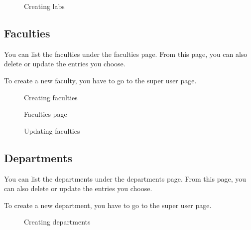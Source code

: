 \documentclass[letterpaper,10pt,english]{sphinxmanual}
\begin{document}
\begin{figure}[htbp]
\centering
\capstart

\noindent{}
\caption{Creating labs}\label{\detokenize{user/kaplan:id7}}\end{figure}


\subsection{Faculties}
\label{\detokenize{user/kaplan:faculties}}
You can list the faculties under the faculties page. From this page, you can also delete or update
the entries you choose.

To create a new faculty, you have to go to the super user page.

\begin{figure}[htbp]
\centering
\capstart

\noindent{}
\caption{Creating faculties}\label{\detokenize{user/kaplan:id8}}\end{figure}

\begin{figure}[htbp]
\centering
\capstart

\noindent{}
\caption{Faculties page}\label{\detokenize{user/kaplan:id9}}\end{figure}

\begin{figure}[htbp]
\centering
\capstart

\noindent{}
\caption{Updating faculties}\label{\detokenize{user/kaplan:id10}}\end{figure}


\subsection{Departments}
\label{\detokenize{user/kaplan:departments}}
You can list the departments under the departments page. From this page, you can also delete or update
the entries you choose.

To create a new department, you have to go to the super user page.

\begin{figure}[htbp]
\centering
\capstart

\noindent{}
\caption{Creating departments}\label{\detokenize{user/kaplan:id11}}\end{figure}
\end{document}
